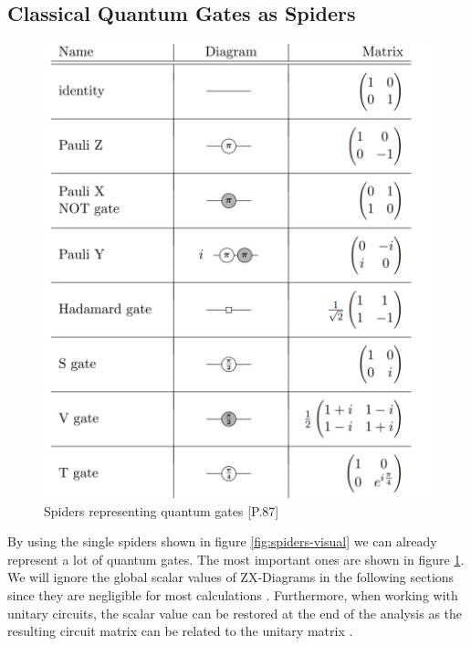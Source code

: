 \subsection{Classical Quantum Gates as Spiders}

\begin{figure}[h]
    \includegraphics[width=\linewidth]{images/single_spider_unitaries.png}
    \caption{Spiders representing quantum gates
            {\cite{vandewetering2020zxcalculus}[P.87]}}
    \label{fig:spiders-gate-representation}
\end{figure}

By using the single spiders shown in figure \ref{fig:spiders-visual} we can already represent a lot of quantum gates. The most important ones are shown in figure \ref{fig:spiders-gate-representation}. We will ignore the global scalar values of ZX-Diagrams in the following sections since they are negligible for most calculations \cite{equivalence_checking_tum}. Furthermore, when working with unitary circuits, the scalar value can be restored at the end of the analysis as the resulting circuit matrix can be related to the unitary matrix \cite{vandewetering2020zxcalculus}.


